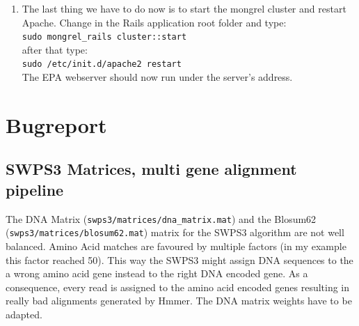 \documentclass{scrartcl}
\begin{document}
\begin{enumerate}
{  			 	 	Allow from all\\
  					$<$/Proxy$>$\\
					$<$/VirtualHost$>$
					}\\
					Some words about this file:
				 Everything until the Proxy tag should be clear how this has to be fitted individually. The \texttt{BalancerMember} are the mongrel units from the mongrel cluster. We previously defined 3 Servers starting at port 8000 in the mongrel\_cluster.yml. These three units are listed here, one on port 8000, one on port 8001 and one on port 8002. If you have made other configurations in your mongrel\_cluster.yml you have to change this here corresponding to that.
				 \item The last thing we have to do now is to start the mongrel cluster and restart Apache. Change in the Rails application root folder and type: \\
				 \texttt{sudo mongrel\_rails cluster::start}\\
				 after that type:\\
				 \texttt{sudo /etc/init.d/apache2 restart}\\
				 The EPA webserver should now run under the server's address. 
				
			
			\end{enumerate}
			
	\section{Bugreport}
		\subsection{SWPS3 Matrices, multi gene alignment pipeline}
			The DNA Matrix (\texttt{swps3/matrices/dna\_matrix.mat}) and the Blosum62 (\texttt{swps3/matrices/blosum62.mat}) matrix for the SWPS3 algorithm are not well balanced. Amino Acid matches are favoured by multiple factors (in my example this factor reached 50). This way the SWPS3 might assign DNA sequences to the a wrong amino acid gene instead to the right DNA encoded gene. As a consequence, every read is assigned to the amino acid encoded genes resulting in really bad alignments generated by Hmmer. The DNA matrix weights have to be adapted.
		
\end{document}
